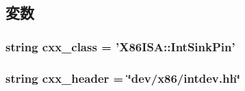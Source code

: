 \subsection{変数}
\hypertarget{classX86IntPin_1_1X86IntSinkPin_a58cd55cd4023648e138237cfc0822ae3}{
\subsubsection[{cxx\_\-class}]{\setlength{\rightskip}{0pt plus 5cm}string {\bf cxx\_\-class} = '{\bf X86ISA::IntSinkPin}'}}
\label{classX86IntPin_1_1X86IntSinkPin_a58cd55cd4023648e138237cfc0822ae3}
\hypertarget{classX86IntPin_1_1X86IntSinkPin_a17da7064bc5c518791f0c891eff05fda}{
\subsubsection[{cxx\_\-header}]{\setlength{\rightskip}{0pt plus 5cm}string {\bf cxx\_\-header} = \char`\"{}dev/x86/intdev.hh\char`\"{}}}
\label{classX86IntPin_1_1X86IntSinkPin_a17da7064bc5c518791f0c891eff05fda}


